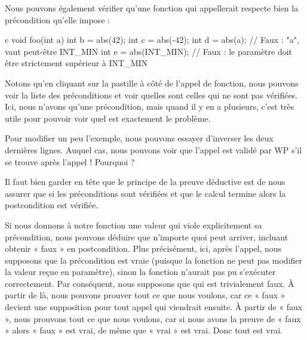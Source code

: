 

Nous pouvons également vérifier qu'une fonction qui appellerait 
respecte bien la précondition qu'elle impose :



\begin{CodeBlock}{c}
void foo(int a){
   int b = abs(42);
   int c = abs(-42);
   int d = abs(a);       // Faux : "a", vaut peut-être INT_MIN
   int e = abs(INT_MIN); // Faux : le paramètre doit être strictement supérieur à INT_MIN
}
\end{CodeBlock}




Notons qu'en cliquant sur la pastille à côté de l'appel de fonction, nous
pouvons voir la liste des préconditions et voir quelles sont celles qui ne sont
pas vérifiées. Ici, nous n'avons qu'une précondition, mais quand il y en a
plusieurs, c'est très utile pour pouvoir voir quel est exactement le problème.




Pour modifier un peu l'exemple, nous pouvons essayer d'inverser les deux
dernières lignes. Auquel cas, nous pouvons voir que l'appel 
est validé par WP s'il se trouve après l'appel  !
Pourquoi ?



Il faut bien garder en tête que le principe de la preuve déductive est de nous
assurer que si les préconditions sont vérifiées et que le calcul termine alors
la postcondition est vérifiée.


Si nous donnons à notre fonction une valeur qui viole explicitement sa
précondition, nous pouvons déduire que n'importe quoi peut arriver, incluant
obtenir « faux » en postcondition. Plus précisément, ici, après l'appel, nous
supposons que la précondition est vraie (puisque la fonction ne peut pas
modifier la valeur reçue en paramètre), sinon la fonction n'aurait pas pu
s'exécuter correctement. Par conséquent, nous supposons que
 qui est trivialement faux. À partir de là,
nous pouvons  prouver tout ce que nous voulons, car ce « faux » devient une
supposition pour tout appel qui viendrait ensuite. À partir de « faux », nous
prouvons tout ce que
nous voulons, car si nous avons la preuve de « faux » alors « faux » est vrai,
de même que « vrai » est vrai. Donc tout est vrai.




